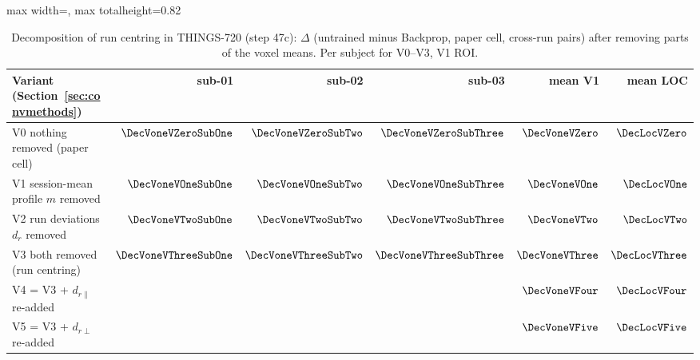 \begin{table}[H]
\centering
\small
\begin{adjustbox}{max width=\textwidth, max totalheight=0.82\textheight}
\begin{tabular}{@{}lrrrrr@{}}
\toprule
Variant (Section~\ref{sec:convmethods}) & sub-01 & sub-02 & sub-03 & mean V1 & mean LOC \\
\midrule
V0 nothing removed (paper cell) & $\DecVoneVZeroSubOne$ & $\DecVoneVZeroSubTwo$ & $\DecVoneVZeroSubThree$ & $\DecVoneVZero$ & $\DecLocVZero$ \\
V1 session-mean profile $m$ removed & $\DecVoneVOneSubOne$ & $\DecVoneVOneSubTwo$ & $\DecVoneVOneSubThree$ & $\DecVoneVOne$ & $\DecLocVOne$ \\
V2 run deviations $d_r$ removed & $\DecVoneVTwoSubOne$ & $\DecVoneVTwoSubTwo$ & $\DecVoneVTwoSubThree$ & $\DecVoneVTwo$ & $\DecLocVTwo$ \\
V3 both removed (run centring) & $\DecVoneVThreeSubOne$ & $\DecVoneVThreeSubTwo$ & $\DecVoneVThreeSubThree$ & $\DecVoneVThree$ & $\DecLocVThree$ \\
V4 = V3 + $d_{r\parallel}$ re-added &  &  &  & $\DecVoneVFour$ & $\DecLocVFour$ \\
V5 = V3 + $d_{r\perp}$ re-added &  &  &  & $\DecVoneVFive$ & $\DecLocVFive$ \\
\bottomrule
\end{tabular}
\end{adjustbox}
\caption{Decomposition of run centring in THINGS-720 (step 47c): $\Delta$ (untrained minus Backprop, paper cell, cross-run pairs) after removing parts of the voxel means. Per subject for V0--V3, V1 ROI.}
\label{tab:decomp}
\end{table}
